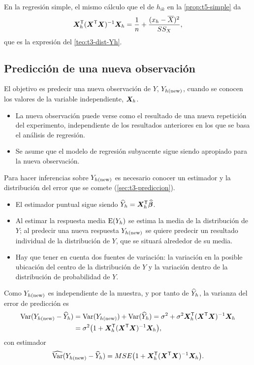 En la regresión simple, el mismo cálculo que el de $h_{ik}$ en la \cref{prop:t5-simple} da
\[
  \bm{X}_h^{\mathsf{T}}(\bm{X}^{\mathsf{T}}\bm{X})^{-1}\bm{X}_h=\frac1n+\frac{(x_h-\overline{X})^2}{SS_X},
\]
que es la expresión del \cref{teo:t3-dist-Yh}.

\subsection{Predicción de una nueva observación}

El objetivo es predecir una nueva observación de $Y$, $Y_{h(\mathrm{new})}$, cuando se conocen los valores de
la variable independiente, $\bm{X}_h$.
\begin{itemize}
  \item La nueva observación puede verse como el resultado de una nueva repetición del
    experimento, independiente de los resultados anteriores en los que se basa el análisis de
    regresión.
  \item Se asume que el modelo de regresión subyacente sigue siendo apropiado para la nueva
    observación.
\end{itemize}

Para hacer inferencias sobre $Y_{h(\mathrm{new})}$ es necesario conocer un estimador y la distribución del
error que se comete (\cref{sec:t3-prediccion}).
\begin{itemize}
  \item El estimador puntual sigue siendo $\widehat{Y}_h=\bm{X}_h^{\mathsf{T}}\widehat{\bm{\beta}}$.
  \item Al estimar la respuesta media $\operatorname{E}(Y_h)$ se estima la media de la distribución de $Y$; al
    predecir una nueva respuesta $Y_{h(\mathrm{new})}$ se quiere predecir un resultado individual de la
    distribución de $Y$, que se situará alrededor de su media.
  \item Hay que tener en cuenta dos fuentes de variación: la variación en la posible ubicación
    del centro de la distribución de $Y$ y la variación dentro de la distribución de
    probabilidad de $Y$.
\end{itemize}
Como $Y_{h(\mathrm{new})}$ es independiente de la muestra, y por tanto de $\widehat{Y}_h$, la varianza del error de
predicción es
\begin{align*}
  \operatorname{Var}(Y_{h(\mathrm{new})}-\widehat{Y}_h) &= \operatorname{Var}(Y_{h(\mathrm{new})})+\operatorname{Var}(\widehat{Y}_h)
  = \sigma^2+\sigma^2\bm{X}_h^{\mathsf{T}}(\bm{X}^{\mathsf{T}}\bm{X})^{-1}\bm{X}_h \\
  &= \sigma^2\big(1+\bm{X}_h^{\mathsf{T}}(\bm{X}^{\mathsf{T}}\bm{X})^{-1}\bm{X}_h\big),
\end{align*}
con estimador
\[
  \widehat{\operatorname{Var}}(Y_{h(\mathrm{new})}-\widehat{Y}_h) = MSE\big(1+\bm{X}_h^{\mathsf{T}}(\bm{X}^{\mathsf{T}}\bm{X})^{-1}\bm{X}_h\big).
\]

